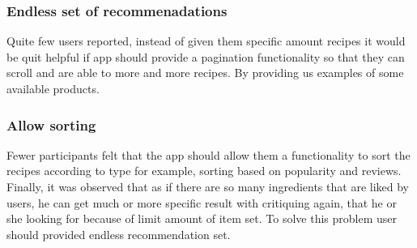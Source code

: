 \subsubsection{Endless set of recommenadations}
Quite few users reported, instead of given them specific amount recipes it would be quit helpful if app should provide a pagination functionality so that they can scroll and are able to more and more recipes. By providing us examples of some available products.
	
\subsubsection{Allow sorting}
Fewer participants felt that the app should allow them a functionality to sort the recipes according to type for example, sorting based on popularity and reviews.\newline
Finally, it was observed that as if there are so many ingredients that are liked by users, he can get much or more specific result with critiquing again, that he or she looking for because of limit amount of item set. To solve this problem user should provided endless recommendation set.

